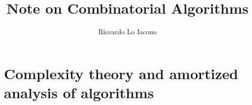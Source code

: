 \documentclass[draft, dawn]{lectures2}
\title{Note on Combinatorial Algorithms}
\author{Riccardo Lo Iacono}
\begin{document}
    \maketitle

    \section[Analysis of algorithms]{Complexity theory and amortized analysis of algorithms}
    
\end{document}
